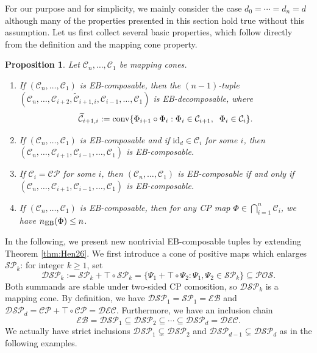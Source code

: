 \documentclass[11pt,reqno]{amsart}
\newtheorem{proposition}[theorem]{Proposition}
\theoremstyle{definition}
\theoremstyle{definition}
\theoremstyle{definition}
\theoremstyle{definition}
\newcommand{\id}{\mathrm{id}}
\newcommand{\PO}{\mathcal{POS}}
\newcommand{\CP}{\mathcal{CP}}
\newcommand{\SP}{\mathcal{SP}}
\newcommand{\DSP}{\mathcal{DSP}}
\newcommand{\EB}{\mathcal{EB}}
\newcommand{\DEC}{\mathcal{DEC}}
\begin{document}
For our purpose and for simplicity, we mainly consider the case $d_0=\cdots= d_n=d$ although many of the properties presented in this section hold true without this assumption. Let us first collect several basic properties, which follow directly from the definition and the mapping cone property.

\begin{proposition} \label{prop:DSPBasic}
Let $\mathcal{C}_n,\ldots, \mathcal{C}_1$ be mapping cones.
\begin{enumerate}
    \item If $(\mathcal{C}_n,\ldots, \mathcal{C}_1)$ is EB-composable, then the $(n-1)$-tuple $(\mathcal{C}_{n},\ldots, \mathcal{C}_{i+2},\widetilde{\mathcal{C}}_{i+1,i}, \mathcal{C}_{i-1},\ldots, \mathcal{C}_1)$ is EB-decomposable, where
        $$\widetilde{\mathcal{C}}_{i+1,i}:={\rm conv}\{\Phi_{i+1}\circ \Phi_i:\Phi_i\in \mathcal{C}_{i+1},\;\; \Phi_i\in \mathcal{C}_i\}.$$

    \item If $(\mathcal{C}_n,\ldots, \mathcal{C}_1)$ is EB-composable and if     $\id_d\in \mathcal{C}_i$ for some $i$, then $(\mathcal{C}_{n},\ldots, \mathcal{C}_{i+1}, \mathcal{C}_{i-1},\ldots, \mathcal{C}_1)$ is EB-composable.

    \item If $\mathcal{C}_i=\CP$ for some $i$, then $(\mathcal{C}_n,\ldots, \mathcal{C}_1)$ is EB-composable if and only if $(\mathcal{C}_{n},\ldots, \mathcal{C}_{i+1}, \mathcal{C}_{i-1},\ldots, \mathcal{C}_1)$ is EB-composable.

    \item If $(\mathcal{C}_n,\ldots, \mathcal{C}_1)$ is EB-composable, then for any CP map $\Phi\in \bigcap_{i=1}^n \mathcal{C}_i$, we have $n_{\rm EB}(\Phi)\leq n$.
\end{enumerate}
\end{proposition}

In the following, we present new nontrivial EB-composable tuples by extending Theorem \ref{thm:Hen26}. We first introduce a cone of positive maps which enlarges $\SP_k$: for integer $k\geq 1$, set
    $$\DSP_k := \SP_k + \top\circ \SP_k=\{\Psi_1+\top \circ\Psi_2: \Psi_1,\Psi_2\in \SP_k\}\subseteq \PO.$$
Both summands are stable under two-sided CP comosition, so $\DSP_k$ is a mapping cone. By definition, we have $\DSP_1=\SP_1=\EB$ and $\DSP_d = \CP + \top \circ \CP = \DEC$. Furthermore, we have an inclusion chain
    $$\EB=\DSP_1\subseteq \DSP_2 \subseteq \cdots \subseteq \DSP_d = \DEC.$$
We actually have strict inclusions $\DSP_1\subsetneq \DSP_2$ and $\DSP_{d-1}\subsetneq \DSP_d$ as in the following examples.
\end{document}
